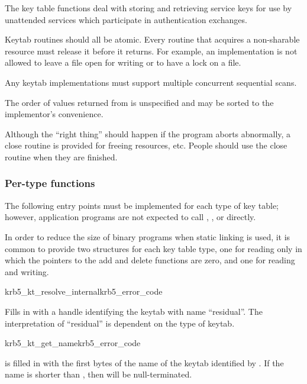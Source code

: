 The key table functions deal with storing and retrieving service keys
for use by unattended services which participate in authentication exchanges.

Keytab routines should all be atomic.  Every routine that acquires
a non-sharable resource must release it before it returns.  For
example, an implementation is not allowed to leave a file open
for writing or to have a lock on a file.

Any keytab implementations must support multiple concurrent sequential scans.

The order of values returned from  is
unspecified and may be sorted to the implementor's convenience.

Although the ``right thing'' should happen if the program aborts
abnormally, a close routine is provided for freeing resources,
etc.  People should use the close routine when they are
finished.

\subsubsection{Per-type functions}
The following entry points must be implemented for each type of
key table; however, application programs are not expected to call
, ,
or  directly.

In order to reduce the size of binary programs when static linking is
used, it is common to provide two  structures for
each key table type, one for reading only in which the pointers to the
add and delete functions are zero, and one for reading and writing.

\begin{funcdecl}{krb5_kt_resolve_internal}{krb5_error_code}{\funcin}
\funcout
{}
\end{funcdecl}

Fills in  with a handle identifying the keytab with name
``residual''.  The interpretation of ``residual'' is dependent on the
type of keytab.

\begin{funcdecl}{krb5_kt_get_name}{krb5_error_code}{\funcin}
\funcout
{}
\funcin
{}
\end{funcdecl}

 is filled in with the first  bytes of
the name of the keytab identified by .
If the name is shorter than , then 
will be null-terminated.

